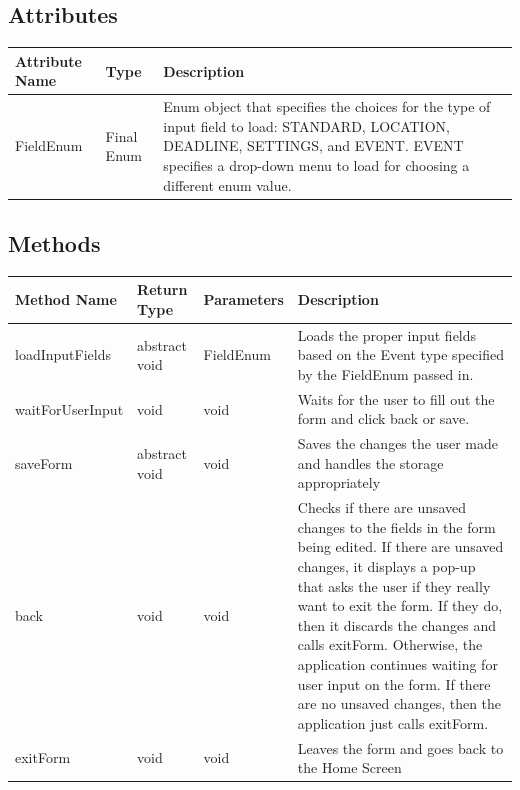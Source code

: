 \documentclass{scrreprt}
\begin{document}
\subsection{Attributes}

\begin{center}
\begin{longtable}{ | p{3cm} | p{3cm} | p{9cm} | }
\hline
\textbf{Attribute Name} & \textbf{Type} & \textbf{Description} \\
\hline
FieldEnum & Final Enum & Enum object that specifies the choices for the type of input field to load: STANDARD, LOCATION, DEADLINE, SETTINGS, and EVENT.  EVENT specifies a drop-down menu to load for choosing a different enum value. \\
\hline
\end{longtable}
\end{center}

\subsection{Methods}

\begin{center}
\begin{longtable}{ | p{3cm} | p{2cm} | p{2cm} | p{8cm} | }
\hline
\textbf{Method Name} & \textbf{Return Type} & \textbf{Parameters} & \textbf{Description} \\
\hline
loadInputFields & abstract void & FieldEnum & Loads the proper input fields based on the Event type specified by the FieldEnum passed in.\\
\hline
waitForUserInput & void & void & Waits for the user to fill out the form and click back or save. \\
\hline
saveForm & abstract void & void & Saves the changes the user made and handles the storage appropriately \\
\hline
back & void & void & Checks if there are unsaved changes to the fields in the form being edited.  If there are unsaved changes, it displays a pop-up that asks the user if they really want to exit the form.  If they do, then it discards the changes and calls exitForm.  Otherwise, the application continues waiting for user input on the form.  If there are no unsaved changes, then the application just calls exitForm.\\
\hline
exitForm & void & void & Leaves the form and goes back to the Home Screen \\
\hline
\end{longtable}
\end{center}
\end{document}
